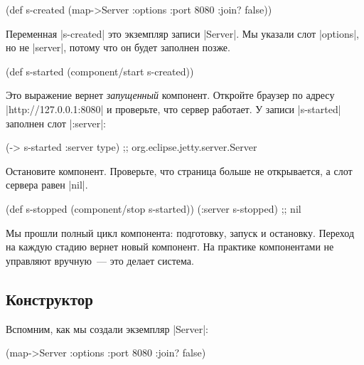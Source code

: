 \begin{english}
  \begin{clojure}
(def s-created
  (map->Server
   {:options {:port 8080 :join? false}}))
  \end{clojure}
\end{english}

Переменная \spverb|s-created| это экземпляр записи \spverb|Server|. Мы указали
слот \spverb|options|, но не \spverb|server|, потому что он будет заполнен
позже.

\begin{english}
  \begin{clojure}
(def s-started (component/start s-created))
  \end{clojure}
\end{english}

Это выражение вернет \emph{запущенный} компонент. Откройте браузер по адресу
\spverb|http://127.0.0.1:8080| и проверьте, что сервер работает. У записи
\spverb|s-started| заполнен слот \spverb|:server|:

\begin{english}
  \begin{clojure}
(-> s-started :server type)
;; org.eclipse.jetty.server.Server
  \end{clojure}
\end{english}

Остановите компонент. Проверьте, что страница больше не открывается, а слот
сервера равен \spverb|nil|.

\begin{english}
  \begin{clojure}
(def s-stopped (component/stop s-started))
(:server s-stopped) ;; nil
  \end{clojure}
\end{english}

Мы прошли полный цикл компонента: подготовку, запуск и остановку. Переход на
каждую стадию вернет новый компонент. На практике компонентами не управляют
вручную~--- это делает система.

\subsection{Конструктор}

Вспомним, как мы создали экземпляр \spverb|Server|:

\begin{english}
  \begin{clojure}
(map->Server {:options {:port 8080 :join? false}})
  \end{clojure}
\end{english}

